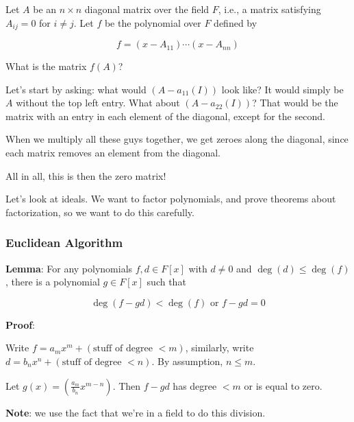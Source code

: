\documentclass[12pt]{article}
\begin{document}
  {
    Let $A$ be an $n \times n$ diagonal matrix over the field $F$, i.e., a
    matrix satisfying $A_{ij} = 0$ for $i \ne j$. Let $f$ be the polynomial over
    $F$ defined by

    \[
      f = (x - A_{11}) \cdots (x - A_{nn})
    \]

    What is the matrix $f(A)$?
  }
  {
    Let's start by asking: what would $(A - a_{11}(I))$ look like? It would
    simply be $A$ without the top left entry. What about $(A - a_{22}(I))$? That
    would be the matrix with an entry in each element of the diagonal, except
    for the second.

    When we multiply all these guys together, we get zeroes along the diagonal,
    since each matrix removes an element from the diagonal.

    All in all, this is then the zero matrix!
  }

  Let's look at ideals. We want to factor polynomials, and prove theorems about
  factorization, so we want to do this carefully.

  \subsubsection{Euclidean Algorithm}

  {\bf Lemma}: For any polynomials $f, d \in F[x]$ with $d \ne 0$ and $\deg(d)
  \le \deg(f)$, there is a polynomial $g \in F[x]$ such that

  \[
    \deg(f - gd) < \deg(f) \text{ or } f - gd = 0
  \]

  {\bf Proof}: 

  Write $f = a_mx^m + (\text{stuff of degree $< m$})$, similarly, write $d = b_n
  x^n + (\text{stuff of degree $< n$})$. By assumption, $n \le m$.

  Let $g(x) = (\frac{a_m}{b_n} x^{m - n})$. Then $f - gd$ has
  degree $<m$ or is equal to zero.

  {\bf Note}: we use the fact that we're in a field to do this division.
\end{document}
